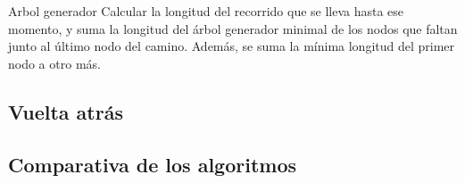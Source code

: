 \begin{frame}{Arbol generador}
  Calcular la longitud del recorrido que se lleva hasta ese momento, y suma la longitud del árbol generador minimal de los nodos que faltan junto al último nodo del camino. Además, se suma la mínima longitud del primer nodo a otro más.
  
\end{frame}

\subsection{Vuelta atrás}


\subsection{Comparativa de los algoritmos}

